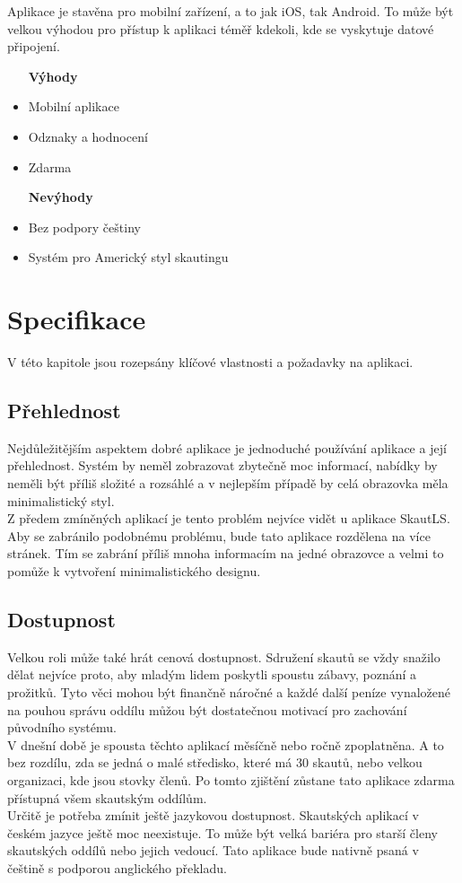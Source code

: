 \documentclass[twoside]{ctuthesis}
\begin{document}
Aplikace je stavěna pro mobilní zařízení, a to jak iOS, tak Android. To může být velkou výhodou pro přístup k aplikaci téměř kdekoli, kde se vyskytuje datové připojení. 

\begin{itemize}
\setlength{\itemindent}{0.7cm}
    \item [\textbf{Výhody}]
    \item Mobilní aplikace
    \item Odznaky a hodnocení
    \item Zdarma
\end{itemize}
\begin{itemize}
\setlength{\itemindent}{1.1cm}
    \item [\textbf{Nevýhody}]
    \setlength{\itemindent}{0.7cm}
    \item Bez podpory češtiny
    \item Systém pro Americký styl skautingu
\end{itemize}

\chapter{Specifikace}
V této kapitole jsou rozepsány klíčové vlastnosti a požadavky na aplikaci.
\section{Přehlednost}
Nejdůležitějším aspektem dobré aplikace je jednoduché používání aplikace a její přehlednost. Systém by neměl zobrazovat zbytečně moc informací, nabídky by neměli být příliš složité a rozsáhlé a v nejlepším případě by celá obrazovka měla minimalistický styl. \\
Z předem zmíněných aplikací je tento problém nejvíce vidět u aplikace SkautLS. Aby se zabránilo podobnému problému, bude tato aplikace rozdělena na více stránek. Tím se zabrání příliš mnoha informacím na jedné obrazovce a velmi to pomůže k vytvoření minimalistického designu. 

\section{Dostupnost} 
Velkou roli může také hrát cenová dostupnost. Sdružení skautů se vždy snažilo dělat nejvíce proto, aby mladým lidem poskytli spoustu zábavy, poznání a prožitků. Tyto věci mohou být finančně náročné a každé další peníze vynaložené na pouhou správu oddílu můžou být dostatečnou motivací pro zachování původního systému. \\
V dnešní době je spousta těchto aplikací měsíčně nebo ročně zpoplatněna. A to bez rozdílu, zda se jedná o malé středisko, které má 30 skautů, nebo velkou organizaci, kde jsou stovky členů. Po tomto zjištění zůstane tato aplikace zdarma přístupná všem skautským oddílům. \\
Určitě je potřeba zmínit ještě jazykovou dostupnost. Skautských aplikací v českém jazyce ještě moc neexistuje. To může být velká bariéra pro starší členy skautských oddílů nebo jejich vedoucí. Tato aplikace bude nativně psaná v češtině s podporou anglického překladu.
\end{document}
